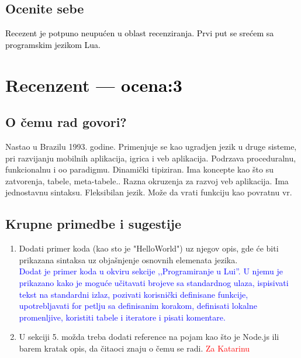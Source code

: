 \documentclass[a4paper]{report}
\newcommand{\odgovor}[1]{\textcolor{black}{#1}}
\newcommand{\odgovorAutora}[1]{\textcolor{blue}{#1}}
\newcommand{\note}[1]{\textcolor{red}{#1}}
\begin{document}
\section{Ocenite sebe}
\odgovor{
Recezent je potpuno neupućen u oblast recenziranja. Prvi put se srećem sa programskim jezikom Lua. 
}
\chapter{Recenzent \odgovor{--- ocena:3} }


\section{O čemu rad govori?}

Nastao u Brazilu 1993. godine. Primenjuje se kao ugradjen jezik u druge sisteme, pri razvijanju mobilnih aplikacija, igrica i veb aplikacija. Podrzava proceduralnu, funkcionalnu i oo paradigmu. Dinami\v cki tipiziran. Ima koncepte kao \v sto su zatvorenja, tabele, meta-tabele.. Razna okruzenja za razvoj veb aplikacija. Ima jednostavnu sintaksu. Fleksibilan jezik. Mo\v ze da vrati funkciju kao povratnu vr.

\section{Krupne primedbe i sugestije}
  
  \begin{enumerate}
    \item  Dodati primer koda (kao sto je "HelloWorld") uz njegov opis, gde \' ce biti prikazana sintaksa uz obja\v snjenje osnovnih elemenata jezika. \\
\odgovorAutora{Dodat je primer koda u okviru sekcije ,,Programiranje u Lui''. U njemu je prikazano kako je moguće učitavati brojeve sa standardnog ulaza, ispisivati tekst na standardni izlaz, pozivati korisnički definisane funkcije, upotrebljavati for petlju sa definisanim korakom, definisati lokalne promenljive, koristiti tabele i iteratore i pisati komentare.}
    \item U sekciji 5. mo\v zda treba dodati reference na pojam kao \v sto je Node.js ili barem kratak opis, da \v citaoci znaju o \v cemu se radi. \note{Za Katarinu}
  \end{enumerate}
\end{document}
